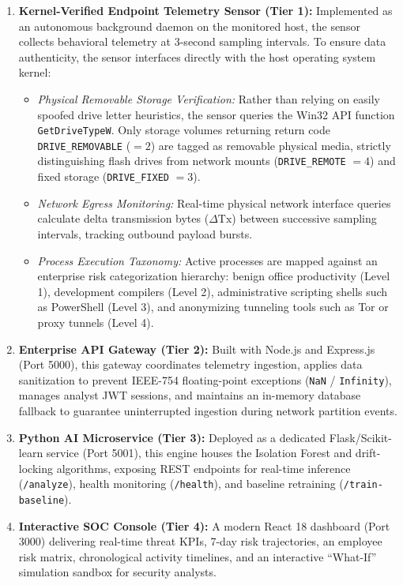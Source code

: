 \documentclass[conference]{IEEEtran}
\begin{document}
\begin{enumerate}
    \item \textbf{Kernel-Verified Endpoint Telemetry Sensor (Tier 1):} Implemented as an autonomous background daemon on the monitored host, the sensor collects behavioral telemetry at 3-second sampling intervals. To ensure data authenticity, the sensor interfaces directly with the host operating system kernel:
    \begin{itemize}
        \item \textit{Physical Removable Storage Verification:} Rather than relying on easily spoofed drive letter heuristics, the sensor queries the Win32 API function \texttt{GetDriveTypeW}. Only storage volumes returning return code \texttt{DRIVE\_REMOVABLE} ($= 2$) are tagged as removable physical media, strictly distinguishing flash drives from network mounts (\texttt{DRIVE\_REMOTE} $= 4$) and fixed storage (\texttt{DRIVE\_FIXED} $= 3$).
        \item \textit{Network Egress Monitoring:} Real-time physical network interface queries calculate delta transmission bytes ($\Delta \text{Tx}$) between successive sampling intervals, tracking outbound payload bursts.
        \item \textit{Process Execution Taxonomy:} Active processes are mapped against an enterprise risk categorization hierarchy: benign office productivity (Level 1), development compilers (Level 2), administrative scripting shells such as PowerShell (Level 3), and anonymizing tunneling tools such as Tor or proxy tunnels (Level 4).
    \end{itemize}
    \item \textbf{Enterprise API Gateway (Tier 2):} Built with Node.js and Express.js (Port 5000), this gateway coordinates telemetry ingestion, applies data sanitization to prevent IEEE-754 floating-point exceptions (\texttt{NaN} / \texttt{Infinity}), manages analyst JWT sessions, and maintains an in-memory database fallback to guarantee uninterrupted ingestion during network partition events.
    \item \textbf{Python AI Microservice (Tier 3):} Deployed as a dedicated Flask/Scikit-learn service (Port 5001), this engine houses the Isolation Forest and drift-locking algorithms, exposing REST endpoints for real-time inference (\texttt{/analyze}), health monitoring (\texttt{/health}), and baseline retraining (\texttt{/train-baseline}).
    \item \textbf{Interactive SOC Console (Tier 4):} A modern React 18 dashboard (Port 3000) delivering real-time threat KPIs, 7-day risk trajectories, an employee risk matrix, chronological activity timelines, and an interactive ``What-If'' simulation sandbox for security analysts.
\end{enumerate}
\end{document}
